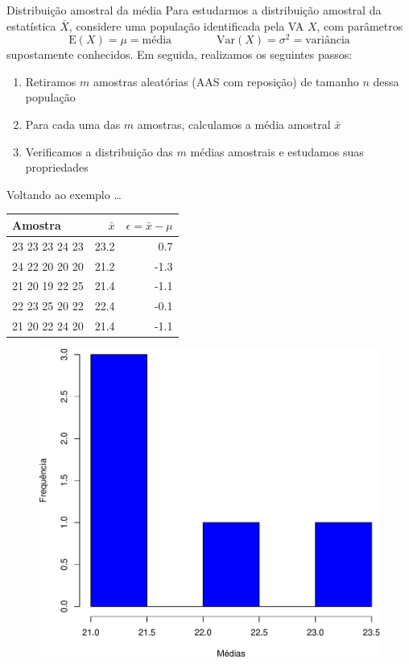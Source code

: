 \documentclass[10pt]{beamer}\usepackage[]{graphicx}\usepackage[]{color}
\providecommand{\E}{\text{E}}
\providecommand{\Var}{\text{Var}}
\theoremstyle{definition}
\begin{document}
\begin{frame}[fragile=singleslide]{Distribuição amostral da média}
  Para estudarmos a distribuição amostral da estatística $\bar{X}$,
  considere uma população identificada pela VA $X$, com parâmetros
  \begin{equation*}
    \E(X) = \mu = \text{média} \qquad \qquad \Var(X) = \sigma^2 =
    \text{variância}
  \end{equation*}
  supostamente conhecidos. Em seguida, realizamos os seguintes passos:
  \begin{enumerate}
  \item Retiramos $m$ amostras aleatórias (AAS com reposição) de tamanho
    $n$ dessa população
  \item Para cada uma das $m$ amostras, calculamos a média amostral
    $\bar{x}$
  \item Verificamos a distribuição das $m$ médias amostrais e estudamos
    suas propriedades
  \end{enumerate}
\end{frame}

\begin{frame}{Voltando ao exemplo \ldots}
  \begin{table}[h]
    \centering
    \small
    \begin{tabular}{lrr}
      \hline
      Amostra & $\bar{x}$ & $\epsilon = \bar{x} - \mu$ \\
      \hline
      23 23 23 24 23 & 23.2 & 0.7 \\
      24 22 20 20 20 & 21.2 & -1.3 \\
      21 20 19 22 25 & 21.4 & -1.1 \\
      22 23 25 20 22 & 22.4 & -0.1 \\
      21 20 22 24 20 & 21.4 & -1.1 \\
      \hline
    \end{tabular}
  \end{table}
  \begin{figure}[h]
    \centering
    \includegraphics[width=.5\textwidth]{hist-crop}
  \end{figure}
\end{frame}
\end{document}
